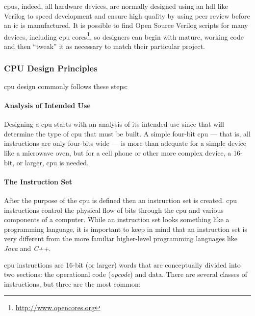 \glspl{cpu}, indeed, all hardware devices, are normally designed using an \gls{hdl} like Verilog to speed development and ensure high quality by using peer review before an \gls{ic} is manufactured. It is possible to find Open Source Verilog scripts for many devices, including \gls{cpu} cores\footnote{\url{http://www.opencores.org}}, so designers can begin with mature, working code and then ``tweak'' it as necessary to match their particular project.

\subsubsection{CPU Design Principles}

\gls{cpu} design commonly follows these steps:

\paragraph{Analysis of Intended Use} Designing a \gls{cpu} starts with an analysis of its intended use since that will determine the type of \gls{cpu} that must be built. A simple four-bit \gls{cpu} --- that is, all instructions are only four-bits wide --- is more than adequate for a simple device like a microwave oven, but for a cell phone or other more complex device, a 16-bit, or larger, \gls{cpu} is needed. 

\paragraph{The Instruction Set} After the purpose of the \gls{cpu} is defined then an instruction set is created. \gls{cpu} instructions control the physical flow of bits through the \gls{cpu} and various components of a computer. While an instruction set looks something like a programming language, it is important to keep in mind that an instruction set is very different from the more familiar higher-level programming languages like \emph{Java} and \emph{C++}.

\gls{cpu} instructions are 16-bit (or larger) words that are conceptually divided into two sections: the operational code (\emph{opcode}) and data. There are several classes of instructions, but three are the most common: 

